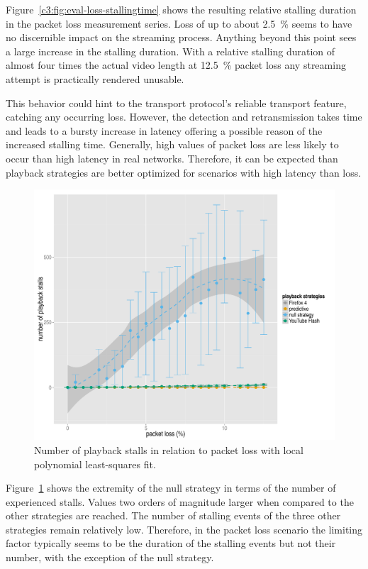Figure~\ref{c3:fig:eval-loss-stallingtime} shows the resulting relative stalling duration in the packet loss measurement series. Loss of up to about \SI{2.5}{\percent} seems to have no discernible impact on the streaming process. Anything beyond this point sees a large increase in the stalling duration. With a relative stalling duration of almost four times the actual video length at \SI{12.5}{\percent} packet loss any streaming attempt is practically rendered unusable. 

This behavior could hint to the transport protocol's reliable transport feature, catching any occurring loss. However, the detection and retransmission takes time and leads to a bursty increase in latency offering a possible reason of the increased stalling time. Generally, high values of packet loss are less likely to occur than high latency in real networks. Therefore, it can be expected than playback strategies are better optimized for scenarios with high latency than loss.

\begin{figure}[htbp]
	\centering
	\includegraphics[width=1.0\textwidth]{images/R-playbackemulation-stallnumber-loss.pdf}
	\caption{Number of playback stalls in relation to packet loss with local polynomial least-squares fit.}
\label{c3:fig:eval-loss-numstalls}
\end{figure}


Figure~\ref{c3:fig:eval-loss-numstalls} shows the extremity of the null strategy in terms of the number of experienced stalls. Values two orders of magnitude larger when compared to the other strategies are reached. The number of stalling events of the three other strategies remain relatively low. Therefore, in the packet loss scenario the limiting factor typically seems to be the duration of the stalling events but not their number, with the exception of the null strategy.


